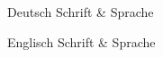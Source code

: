 

\begin{cvskills}

    {Deutsch Schrift \& Sprache}

    {Englisch Schrift \& Sprache}

\end{cvskills}
